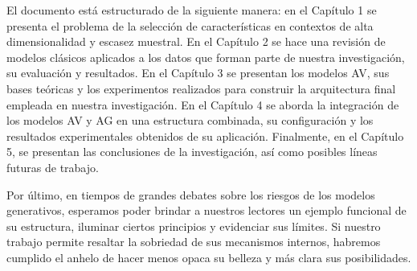 El documento está estructurado de la siguiente manera: en el Capítulo 1 se presenta el problema de la selección de características en contextos de alta dimensionalidad y escasez muestral. En el Capítulo 2 se hace una revisión de modelos clásicos aplicados a los datos que forman parte de nuestra investigación, su evaluación y resultados. En el Capítulo 3 se presentan los modelos AV, sus bases teóricas y los experimentos realizados para construir la arquitectura final empleada en nuestra investigación. En el Capítulo 4 se aborda la integración de los modelos AV y AG en una estructura combinada, su configuración y los resultados experimentales obtenidos de su aplicación. Finalmente, en el Capítulo 5, se presentan las conclusiones de la investigación, así como posibles líneas futuras de trabajo.

Por último, en tiempos de grandes debates sobre los riesgos de los modelos generativos, esperamos poder brindar a nuestros lectores un ejemplo funcional de su estructura, iluminar ciertos principios y evidenciar sus límites. Si nuestro trabajo permite resaltar la sobriedad de sus mecanismos internos, habremos cumplido el anhelo de hacer menos opaca su belleza y más clara sus posibilidades.
